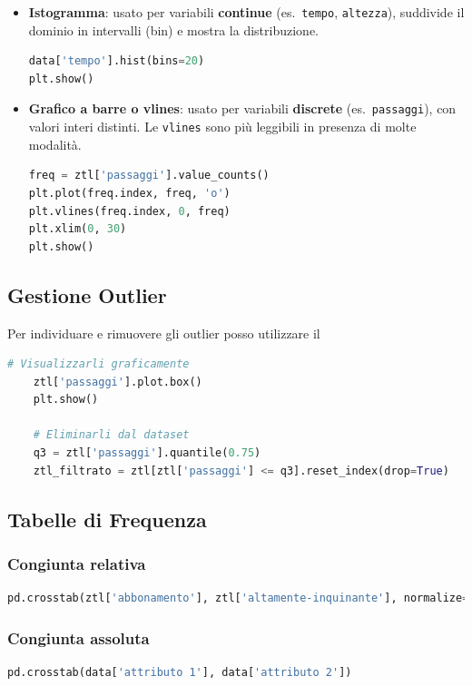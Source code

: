 \documentclass{article}
\begin{document}
\begin{itemize}
  \item \textbf{Istogramma}: usato per variabili \textbf{continue} (es.\ \texttt{tempo}, \texttt{altezza}), suddivide il dominio in intervalli (bin) e mostra la distribuzione.
  \begin{lstlisting}[language=Python]
data['tempo'].hist(bins=20)
plt.show()
  \end{lstlisting}

  \item \textbf{Grafico a barre o vlines}: usato per variabili \textbf{discrete} (es.\ \texttt{passaggi}), con valori interi distinti. Le \texttt{vlines} sono più leggibili in presenza di molte modalità.
  \begin{lstlisting}[language=Python]
freq = ztl['passaggi'].value_counts()
plt.plot(freq.index, freq, 'o')
plt.vlines(freq.index, 0, freq)
plt.xlim(0, 30)
plt.show()
  \end{lstlisting}
\end{itemize}


\subsection*{Gestione Outlier}

Per individuare e rimuovere gli outlier posso utilizzare il 

\begin{lstlisting}[language=Python]
    # Visualizzarli graficamente
    ztl['passaggi'].plot.box()
    plt.show()

    # Eliminarli dal dataset
    q3 = ztl['passaggi'].quantile(0.75)
    ztl_filtrato = ztl[ztl['passaggi'] <= q3].reset_index(drop=True)
\end{lstlisting}

\subsection*{Tabelle di Frequenza}

\subsubsection*{Congiunta relativa}
\begin{lstlisting}[language=Python]
pd.crosstab(ztl['abbonamento'], ztl['altamente-inquinante'], normalize=True)
\end{lstlisting}

\subsubsection*{Congiunta assoluta}
\begin{lstlisting}[language=Python]
    pd.crosstab(data['attributo 1'], data['attributo 2'])
\end{lstlisting}
\end{document}
